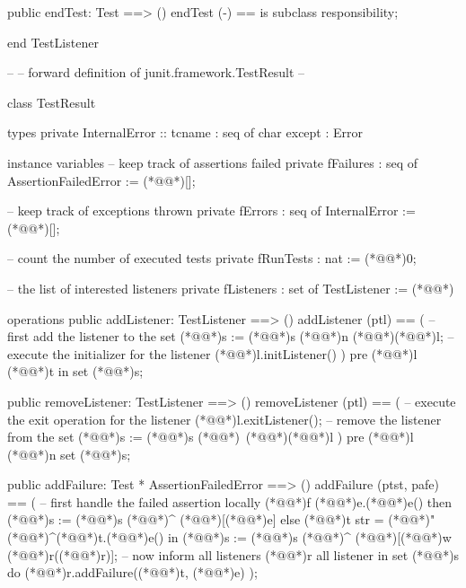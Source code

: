 \documentclass[a4paper]{article}
\begin{document}
\begin{vdm_al}
  public endTest: Test ==> ()
  endTest (-) == is subclass responsibility;
  
end TestListener

--
-- forward definition of junit.framework.TestResult
--

class TestResult

types
  private InternalError :: tcname : seq of char
                           except : Error
                   
instance variables
  -- keep track of assertions failed
  private fFailures : seq of AssertionFailedError := (*@\vdmnotcovered{}@*)[];
  
  -- keep track of exceptions thrown
  private fErrors : seq of InternalError := (*@\vdmnotcovered{}@*)[];
  
  -- count the number of executed tests
  private fRunTests : nat := (*@\vdmnotcovered{}@*)0;
  
  -- the list of interested listeners
  private fListeners : set of TestListener := (*@\vdmnotcovered{}@*){}
  
operations
  public addListener: TestListener ==> ()
  addListener (ptl) == 
    ( -- first add the listener to the set
      (*@@*)s := (*@@*)s (*@@*)n (*@\vdmnotcovered{}@*){(*@@*)l};
      -- execute the initializer for the listener
      (*@@*)l.initListener() )
    pre (*@@*)l (*@@*)t in set (*@@*)s;
  
  public removeListener: TestListener ==> ()
  removeListener (ptl) ==
    ( -- execute the exit operation for the listener
      (*@@*)l.exitListener();
      -- remove the listener from the set
      (*@@*)s := (*@@*)s (*@\vdmnotcovered{}@*)\ (*@\vdmnotcovered{}@*){(*@@*)l} )
    pre (*@@*)l (*@@*)n set (*@@*)s;
  
  public addFailure: Test * AssertionFailedError ==> ()
  addFailure (ptst, pafe) == 
    ( -- first handle the failed assertion locally
      (*@@*)f (*@@*)e.(*@@*)e()
      then (*@@*)s := (*@@*)s (*@\vdmnotcovered{}@*)^ (*@\vdmnotcovered{}@*)[(*@@*)e]
      else (*@@*)t str = (*@@*)"(*@\vdmnotcovered{}@*)^(*@@*)t.(*@@*)e() in
             (*@@*)s := (*@@*)s (*@\vdmnotcovered{}@*)^ (*@\vdmnotcovered{}@*)[(*@@*)w (*@@*)r((*@@*)r)];
      -- now inform all listeners
      (*@@*)r all listener in set (*@@*)s do
        (*@@*)r.addFailure((*@@*)t, (*@@*)e) );
  

\end{vdm_al}
\end{document}
